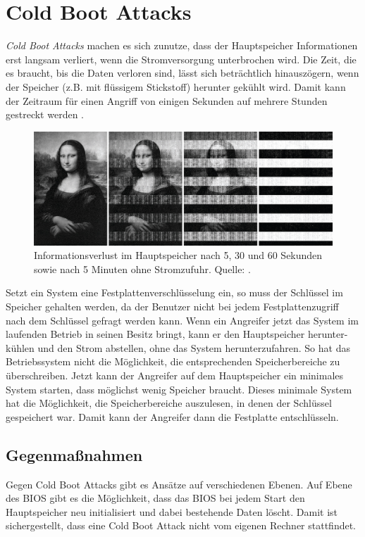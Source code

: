 \section{Cold Boot Attacks}
\emph{Cold Boot Attacks} machen es sich zunutze, dass der Hauptspeicher
Informationen erst langsam verliert, wenn die Stromversorgung
unterbrochen wird. Die Zeit, die es braucht, bis die Daten verloren
sind, lässt sich beträchtlich hinauszögern, wenn der Speicher (z.B. mit
flüssigem Stickstoff) herunter gekühlt wird. Damit kann der Zeitraum für
einen Angriff von einigen Sekunden auf mehrere Stunden gestreckt werden
\cite{Halderman08}.

\begin{figure}[h]
  \centering
  \includegraphics[width=\textwidth]{images/mona-lisa.jpg}
  \caption{Informationsverlust im Hauptspeicher nach 5, 30 und 60 Sekunden sowie nach 5
    Minuten ohne Stromzufuhr. Quelle: \cite{Halderman08}.}
  \label{fig:mona-lisa}
\end{figure}

Setzt ein System eine Festplattenverschlüsselung ein, so muss der
Schlüssel im Speicher gehalten werden, da der Benutzer nicht bei jedem
Festplattenzugriff nach dem Schlüssel gefragt werden kann. Wenn ein
Angreifer jetzt das System im laufenden Betrieb in seinen Besitz bringt,
kann er den Hauptspeicher herunter-kühlen und den Strom abstellen, ohne
das System herunterzufahren. So hat das Betriebssystem nicht die
Möglichkeit, die entsprechenden Speicherbereiche zu überschreiben. Jetzt
kann der Angreifer auf dem Hauptspeicher ein minimales System starten,
dass möglichst wenig Speicher braucht. Dieses minimale System hat die
Möglichkeit, die Speicherbereiche auszulesen, in denen der Schlüssel
gespeichert war. Damit kann der Angreifer dann die Festplatte
entschlüsseln.

\subsection{Gegenmaßnahmen}
Gegen Cold Boot Attacks gibt es Ansätze auf verschiedenen Ebenen. Auf
Ebene des BIOS gibt es die Möglichkeit, dass das BIOS bei jedem Start
den Hauptspeicher neu initialisiert und dabei bestehende Daten
löscht. Damit ist sichergestellt, dass eine Cold Boot Attack nicht vom
eigenen Rechner stattfindet.

